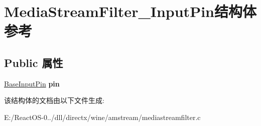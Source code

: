 \hypertarget{struct_media_stream_filter___input_pin}{}\section{Media\+Stream\+Filter\+\_\+\+Input\+Pin结构体 参考}
\label{struct_media_stream_filter___input_pin}
\subsection*{Public 属性}
\begin{DoxyCompactItemize}
\item 
\mbox{\label{struct_media_stream_filter___input_pin_ac3e7e30955fc300827d8147bb9ba58a5}} 
\hyperlink{struct_base_input_pin}{Base\+Input\+Pin} {\bfseries pin}
\end{DoxyCompactItemize}


该结构体的文档由以下文件生成\+:\begin{DoxyCompactItemize}
\item 
E\+:/\+React\+O\+S-\/0../dll/directx/wine/amstream/mediastreamfilter.\+c\end{DoxyCompactItemize}
